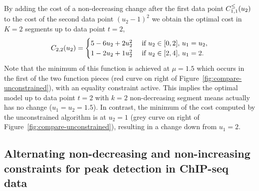 \documentclass[aoas]{imsart}
\begin{document}
By adding the cost of a non-decreasing change after the first data
point $C_{1,1}^\leq(u_2)$ to the cost of the second data point
$(u_2-1)^2$ we obtain the optimal cost in $K=2$ segments up to data
point $t=2$,
\begin{equation}
  \FCC_{2,2}(u_2) = 
  \begin{cases}
    5 - 6 u_2 + 2 u_2^2 &\text{ if }u_2\in[0,2],\,  u_1=u_2,\\
    1 - 2 u_2 + 1 u_2^2 &\text{ if }u_2\in[2,4],\,  u_1=2.
  \end{cases}
\end{equation}
Note that the minimum of this function is achieved at $\mu=1.5$ which
occurs in the first of the two function pieces (red curve on right of
Figure~\ref{fig:compare-unconstrained}), with an equality constraint
active. This implies the optimal model up to data point $t=2$ with
$k=2$ non-decreasing segment means actually has no change
($u_1=u_2=1.5$). In contrast, the minimum of the cost computed by the
unconstrained algorithm is at $u_2=1$ (grey curve on right of
Figure~\ref{fig:compare-unconstrained}), resulting in a change down
from $u_1=2$.

\subsection{Alternating non-decreasing and non-increasing constraints for peak detection in ChIP-seq data}
\label{sec:PeakSeg}
\end{document}
